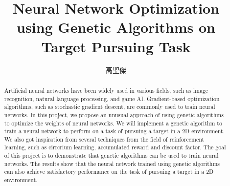 \documentclass[sigconf]{acmart}
\begin{document}
\title{Neural Network Optimization using Genetic Algorithms on Target Pursuing Task}

\begin{CJK}{UTF8}{bkai}
  \author{高聖傑}

\renewcommand{\shortauthors}{Kao, Sheng-Jie}

\begin{abstract}
Artificial neural networks have been widely used in various fields, such as image recognition, natural language processing, and game AI. Gradient-based optimization algorithms, such as stochastic gradient descent, are commonly used to train neural networks. In this project, we propose an unusual approach of using genetic algorithms to optimize the weights of neural networks. We will implement a genetic algorithm to train a neural network to perform on a task of pursuing a target in a 2D environment. We also got inspiration from several techniques from the field of reinforcement learning, such as cirrcrium learning, accumulated reward and discount factor. The goal of this project is to demonstrate that genetic algorithms can be used to train neural networks. The results show that the neural network trained using genetic algorithms can also achieve satisfactory performance on the task of pursuing a target in a 2D environment. 
\end{abstract}

\maketitle
\end{CJK}
\end{document}
